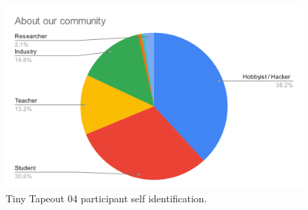 \begin{figure}[!t]
\centering
\includegraphics[width=\columnwidth]{./Figs/about our community pie chart.png}
\caption{Tiny Tapeout 04 participant self identification.}
\label{fig:TT04_submitters}
\end{figure}
